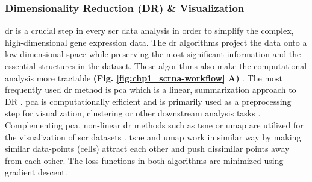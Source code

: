 \subsubsection{Dimensionality Reduction (DR) \& Visualization}
\gls{dr} is a crucial step in every \gls{scr} data analysis in order to simplify the complex, high-dimensional gene expression data. The \gls{dr} algorithms project the data onto a low-dimensional space while preserving the most significant information and the essential structures in the dataset. These algorithms also make the computational analysis more tractable \textbf{(Fig. \ref{fig:chp1_scrna-workflow} A)} \textbf{\cite{lueckenmalte_d_current_2019}}. 
The most frequently used \gls{dr} method is \gls{pca} \textbf{\cite{pearson_lines_1901}} which is a linear, summarization approach to DR \textbf{\cite{lueckenmalte_d_current_2019,heumos_best_2023}}. 
\gls{pca} is computationally efficient and is primarily used as a preprocessing step for visualization, clustering or other downstream analysis tasks \textbf{\cite{lueckenmalte_d_current_2019}}. Complementing \gls{pca}, non-linear \gls{dr} methods such as \gls{tsne} \textbf{\cite{maaten_visualizing_2008}} or \gls{umap} \textbf{\cite{mcinnes_umap_2018}} are utilized for the visualization of \gls{scr} datasets \textbf{\cite{lueckenmalte_d_current_2019,heumos_best_2023}}. \gls{tsne} and \gls{umap} work in similar way by making similar data-points (cells) attract each other and push dissimilar points away from each other. The loss functions in both algorithms are minimized using gradient descent. 
